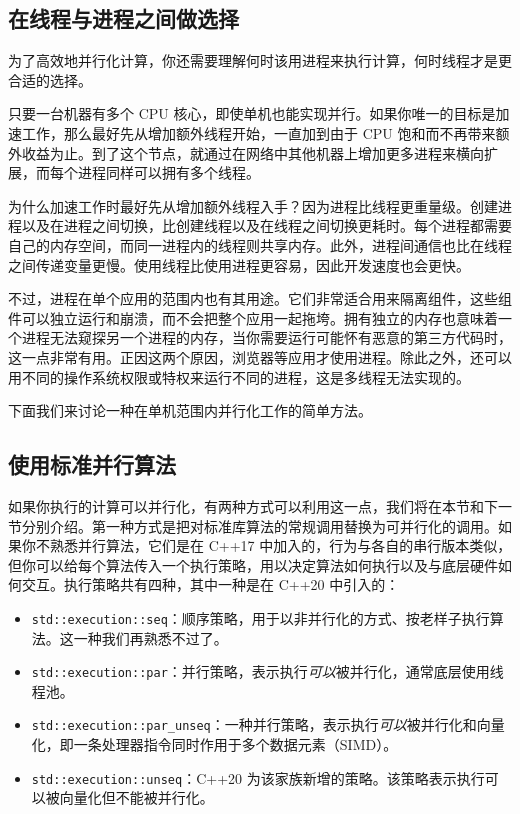\subsection{在线程与进程之间做选择}

\label{idx:1237}
为了高效地并行化计算，你还需要理解何时该用进程来执行计算，何时线程才是更合适的选择。

只要一台机器有多个 CPU 核心，即使单机也能实现并行。如果你唯一的目标是加速工作，那么最好先从增加额外线程开始，一直加到由于 CPU 饱和而不再带来额外收益为止。到了这个节点，就通过在网络中其他机器上增加更多进程来横向扩展，而每个进程同样可以拥有多个线程。

为什么加速工作时最好先从增加额外线程入手？因为进程比线程更重量级。创建进程以及在进程之间切换，比创建线程以及在线程之间切换更耗时。每个进程都需要自己的内存空间，而同一进程内的线程则共享内存。此外，进程间通信也比在线程之间传递变量更慢。使用线程比使用进程更容易，因此开发速度也会更快。

\label{idx:1238}
不过，进程在单个应用的范围内也有其用途。它们非常适合用来隔离组件，这些组件可以独立运行和崩溃，而不会把整个应用一起拖垮。拥有独立的内存也意味着一个进程无法窥探另一个进程的内存，当你需要运行可能怀有恶意的第三方代码时，这一点非常有用。正因这两个原因，浏览器等应用才使用进程。除此之外，还可以用不同的操作系统权限或特权来运行不同的进程，这是多线程无法实现的。

下面我们来讨论一种在单机范围内并行化工作的简单方法。

\subsection{使用标准并行算法}

\label{idx:1239}
\label{idx:1240}
如果你执行的计算可以并行化，有两种方式可以利用这一点，我们将在本节和下一节分别介绍。第一种方式是把对标准库算法的常规调用替换为可并行化的调用。如果你不熟悉并行算法，它们是在 C++17 中加入的，行为与各自的串行版本类似，但你可以给每个算法传入一个执行策略，用以决定算法如何执行以及与底层硬件如何交互。执行策略共有四种，其中一种是在 C++20 中引入的：

\begin{itemize}
\item \texttt{std::\allowbreak{}execution::\allowbreak{}seq}：顺序策略，用于以非并行化的方式、按老样子执行算法。这一种我们再熟悉不过了。
\item \texttt{std::\allowbreak{}execution::\allowbreak{}par}：并行策略，表示执行\emph{可以}被并行化，通常底层使用线程池。
\item \texttt{std::\allowbreak{}execution::\allowbreak{}par\_\allowbreak{}unseq}：一种并行策略，表示执行\emph{可以}被并行化和向量化，即一条处理器指令同时作用于多个数据元素（SIMD）。
\item \texttt{std::\allowbreak{}execution::\allowbreak{}unseq}：C++20 为该家族新增的策略。该策略表示执行可以被向量化但不能被并行化。
\end{itemize}

